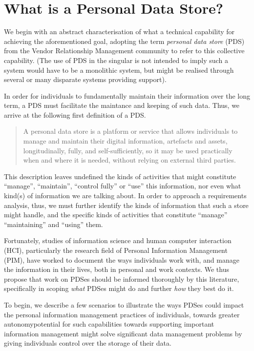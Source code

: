 \documentclass[runningheads,a4paper]{llncs}
\begin{document}
\section{What is a Personal Data Store?}

We begin with an abstract characterisation of what a technical capability for achieving the aforementioned goal, adopting the term  \emph{personal data store} (PDS) from the Vendor Relationship Management community \cite{vrm} to refer to this collective capability. (The use of PDS in the singular is not intended to imply such a system would have to be a monolithic system, but might be realised through several or many disparate systems providing support).

In order for individuals to fundamentally maintain their information over the long term, a PDS must facilitate the maintance and keeping of such data. Thus, we arrive at the following first definition of a PDS.

\begin{quote}

	A personal data store is a platform or service that allows individuals to manage and maintain their digital information, artefacts and assets, longitudinally, fully, and self-sufficiently, so it may be used practically when and where it is needed, without relying on external third parties. 

\end{quote}

This description leaves undefined the kinds of activities that might constitute ``manage'', ``maintain'', ``control fully'' or ``use'' this information, nor even what kind(s) of information we are talking about.  In order to approach a requirements analysis, thus, we must further identify the kinds of information that such a store might handle, and the specific kinds of activities that constitute ``manage'' ``maintaining'' and ``using'' them. 

Fortunately, studies of information science and human computer interaction (HCI), particularly the research field of Personal Information Management (PIM), have worked to document the ways individuals work with, and manage the information in their lives, both in personal and work contexts.  We thus propose that work on PDSes should be informed thoroughly by this literature, specifically in scoping \emph{what} PDSes might do and further \emph{how} they best do it.

To begin, we describe a few scenarios to illustrate the ways PDSes could impact the personal information management practices of individuals, towards greater autonomypotential for such capabilities towards supporting important information management  might solve significant data management problems by giving individuals control over the storage of their data.
\end{document}
